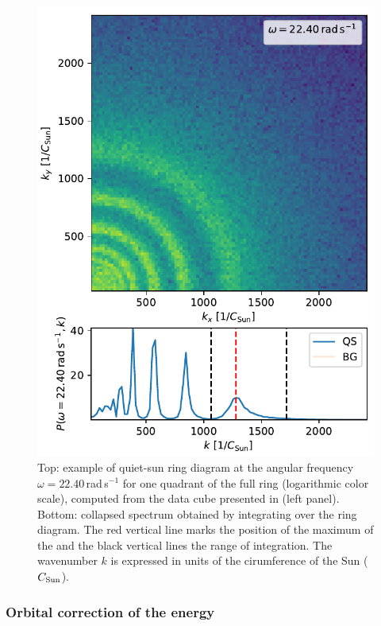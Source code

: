 \documentclass{aa}
\begin{document}
\begin{figure}\centering
	\includegraphics[width=1.0\linewidth]{ring_diagram_spectrum}
	\caption{Top: example of quiet-sun ring diagram at
	the angular frequency 
	$\omega=22.40$\,rad\,s$^{-1}$ 
	for one quadrant of the full ring (logarithmic color scale), computed from the data cube presented in  (left panel). 
	Bottom: collapsed spectrum obtained by 
	integrating over
	the ring diagram. The red vertical line marks the position of the maximum of the \fff and the black vertical lines the range of integration.
	The wavenumber $k$ is expressed in units of the cirumference of the Sun ($C_{\rm Sun}$).}
	\label{ring_diagram}
\end{figure}

\subsubsection*{Orbital correction of the \fff{} 
energy}
\end{document}
